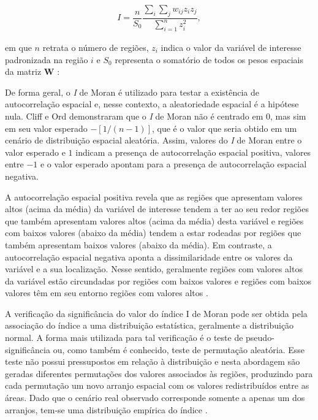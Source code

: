 \documentclass[
	12pt,				%
	openright,			%
	oneside,			%
	a4paper,			%
	chapter=TITLE,		%
	section=TITLE,		%
	english,			%
	french,				%
	spanish,			%
	brazil				%
	]{abntex2}
\begin{document}
\begin{align}
\label{IMoran}
I = \dfrac{n}{S_0} \dfrac{\sum_{i} \sum_{j} w_{ij} z_i z_j}{\sum_{i=1}^{n} z_i^2},
\end{align}

\noindent em que $n$ retrata o número de regiões, $z_i$ indica o valor da variável de interesse padronizada na região $i$ e $S_0$ representa o somatório de todos os pesos espaciais da matriz $\boldsymbol{W}$ \cite{almeida12}:




De forma geral, o \textit{I} de Moran é utilizado para testar a existência de autocorrelação espacial e, nesse contexto, a aleatoriedade espacial é a hipótese nula. Cliff e Ord \cite{cliff81} demonstraram que o \textit{I} de Moran não é centrado em $0$, mas sim em seu valor esperado $-[1/(n-1)]$, que é o valor que seria obtido em um cenário de distribuição espacial aleatória. Assim, valores do \textit{I} de Moran entre o valor esperado e $1$ indicam a presença de autocorrelação espacial positiva, valores entre $-1$ e o valor esperado apontam para a presença de autocorrelação espacial negativa. 

A autocorrelação espacial positiva revela que as regiões que apresentam valores altos (acima da média) da variável de interesse tendem a ter ao seu redor regiões que também apresentam valores altos (acima da média) desta variável e regiões com baixos valores (abaixo da média) tendem a estar rodeadas por regiões que também apresentam baixos valores (abaixo da média). Em contraste, a autocorrelação espacial negativa aponta a  dissimilaridade entre os valores da variável e a sua localização. Nesse sentido, geralmente regiões com valores altos da variável estão circundadas por regiões com baixos valores e regiões com baixos valores têm em seu entorno regiões com valores altos \cite{almeida12}.

A verificação da significância do valor do índice I de Moran pode ser obtida pela associação do índice a uma distribuição estatística, geralmente a distribuição normal. A forma mais utilizada para tal verificação é o teste de pseudo-significância ou, como também é conhecido, teste de permutação aleatória. Esse teste não possui pressupostos em relação à distribuição e nesta abordagem são geradas diferentes permutações dos valores associados às regiões, produzindo para cada permutação um novo arranjo espacial com os valores redistribuídos entre as áreas. Dado que o cenário real observado corresponde somente a apenas um dos arranjos, tem-se uma distribuição empírica do índice \cite{camara04}. 
\end{document}
